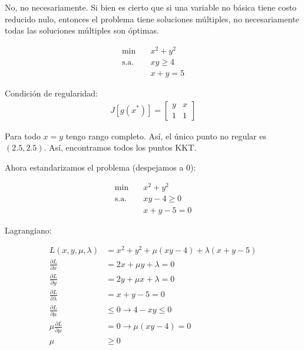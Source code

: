 \documentclass{article}
\newenvironment{question}
{\begin{mdframed}[backgroundcolor=white]}
{\end{mdframed}}
\newenvironment{solution}
{\begin{mdframed}[backgroundcolor=lightorange,hidealllines=true]}
{\end{mdframed}}
\begin{document}
\begin{solution}
    No, no necesariamente. Si bien es cierto que si una variable no básica tiene costo reducido nulo, entonces el problema tiene soluciones múltiples, no necesariamente todas las soluciones múltiples son óptimas.
\end{solution}

\begin{question}
    \begin{align*}
        \min \quad & x^2+y^2 \\
        \text{s.a.} \quad & xy\geq 4\\
        & x+y=5
    \end{align*}
\end{question}

\begin{solution}
    Condición de regularidad:
    \begin{align*}
        J[g(x^*)] = \begin{bmatrix}
            y & x\\
            1 & 1
        \end{bmatrix}
    \end{align*}

    Para todo $x=y$ tengo rango completo. Así, el único punto no regular es $(2.5,2.5)$. Así, encontramos todos los puntos KKT.

    Ahora estandarizamos el problema (despejamos a 0):

    \begin{align*}
        \min \quad & x^2+y^2 \\
        \text{s.a.} \quad & xy-4\geq 0\\
        & x+y-5=0
    \end{align*}

    Lagrangiano:

    \begin{align*}
        L(x,y,\mu, \lambda) &= x^2+y^2 + \mu(xy-4) + \lambda(x+y-5)\\
        \frac{\partial L}{\partial x} &= 2x + \mu y + \lambda = 0\\
        \frac{\partial L}{\partial y} &= 2y + \mu x + \lambda = 0\\
        \frac{\partial L}{\partial \lambda} &= x + y - 5= 0\\
        \frac{\partial L}{\partial \mu} &\leq 0 \to 4-xy \leq 0\\
        \mu\frac{\partial L}{\partial \mu} &= 0 \to \mu(xy-4) = 0\\
        \mu &\geq 0
    \end{align*}


\end{solution}
\end{document}
